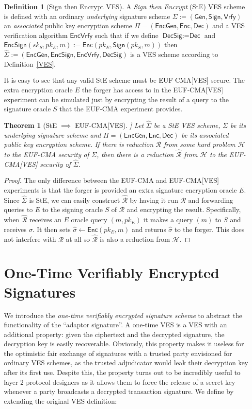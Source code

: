 \documentclass[fullpage]{article}
\newtheorem{theorem}{Theorem}[section]
\theoremstyle{definition}
\newtheorem{definition}{Definition}[section]
\newcommand{\EUFCMA}{\textsf{EUF-CMA}\xspace}
\newcommand{\EUFCMAVES}{\textsf{EUF-CMA}[\textsf{VES}]\xspace}
\newcommand{\Dec}{\textsf{Dec}}
\newcommand{\Enc}{\textsf{Enc}}
\newcommand{\EncGen}{\textsf{EncGen}}
\newcommand{\EncSign}{\textsf{EncSign}}
\newcommand{\EncVer}{\textsf{EncVrfy}}
\newcommand{\DecSig}{\textsf{DecSig}}
\newcommand{\KeyGen}{\textsf{Gen}}
\newcommand{\Sign}{\textsf{Sign}}
\newcommand{\Verify}{\textsf{Vrfy}}
\newcommand{\SIGNALG}{\KeyGen, \Sign, \Verify}
\newcommand{\ENCALG}{\EncGen, \Enc, \Dec}
\newcommand{\skSign}{sk_S}
\newcommand{\pkSign}{pk_S}
\newcommand{\pkEnc}{pk_E}
\newcommand{\hatsigma}{\hat{\sigma}}
\newcommand{\hatSigma}{\hat{\Sigma}}
\newcommand{\R}{\mathcal{R}}
\newcommand{\hatR}{\hat{\mathcal{R}}}
\newcommand{\hardproblem}{\mathcal{H}}
\begin{document}
\begin{definition}[Sign then Encrypt VES]
A \emph{Sign then Encrypt} (StE) VES scheme is defined with an ordinary \emph{underlying} signature scheme $\Sigma := (\SIGNALG)$ an \emph{associated} public key encryption scheme $\Pi = (\ENCALG)$ and a VES verification algorithm $\EncVer$ such that if we define $\DecSig := \Dec$ and $\EncSign(\skSign, \pkEnc, m) := \Enc(\pkEnc, \Sign(\pkSign, m))$ then $\hatSigma := (\EncGen, \EncSign, \EncVer, \DecSig)$ is a VES scheme according to Definition~\ref{VES}.
\end{definition}

It is easy to see that any valid StE scheme must be \EUFCMAVES secure. The extra encryption oracle $E$ the forger has access to in the \EUFCMAVES experiment can be simulated just by encrypting the result of a query to the signature oracle $S$ that the \EUFCMA experiment provides.

\begin{theorem}[StE $\implies$ \EUFCMAVES]
Let $\hatSigma$ be a StE VES scheme,  $\Sigma$ be its underlying signature scheme and $\Pi = (\ENCALG)$ be its associated public key encryption scheme.
If there is reduction $\R$ from some hard problem $\hardproblem$ to the \EUFCMA security of $\Sigma$, then there is a reduction $\hatR$ from $\hardproblem$ to the \EUFCMAVES security of $\hatSigma$.
\end{theorem}

\begin{proof}
The only difference between the \EUFCMA and \EUFCMAVES experiments is that the forger is provided an extra signature encryption oracle $E$. Since $\hatSigma$ is StE, we can easily construct $\hatR$ by having it run $\R$ and forwarding queries to $E$ to the signing oracle $S$ of $\R$ and encrypting the result. Specifically, when $\hatR$ receives an $E$ oracle query $(m, \pkEnc)$ it makes a query $(m)$ to $S$ and receives $\sigma$. It then sets $\hatsigma \gets \Enc(\pkEnc, m)$ and returns $\hatsigma$ to the forger. This does not interfere with $\R$ at all so $\hatR$ is also a reduction from $\hardproblem$.
\end{proof}

\section{One-Time Verifiably Encrypted Signatures}
\label{otVES}
We introduce the \emph{one-time verifiably encrypted signature scheme} to abstract the functionality of the ``adaptor signature''\cite{poelstra-adaptor}. A one-time VES is a VES with an additional property: given the ciphertext and the decrypted signature, the decryption key is easily recoverable.
Obviously, this property makes it useless for the optimistic fair exchange of signatures with a trusted party envisioned for ordinary VES schemes, as the trusted adjudicator would leak their decryption key after its first use.
Despite this, the property turns out to be incredibly useful to layer-2 protocol designers as it allows them to force the release of a secret key whenever a party broadcasts a decrypted transaction signature.
We define by extending the original VES definition:
\end{document}
